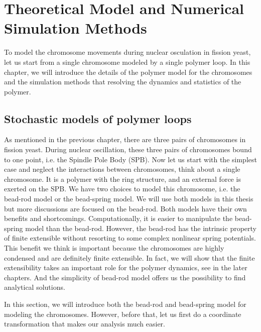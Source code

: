 
\chapter{Theoretical Model and Numerical Simulation Methods}
\graphicspath{{Chapter2/Figs/}}

To model the chromosome movements during nuclear osculation in fission yeast, let us start from a single chromosome modeled by a single polymer loop. 
In this chapter, we will introduce the details of the polymer model for the chromosomes and the simulation methods that resolving the dynamics and statistics of the polymer. 


\section{Stochastic models of polymer loops}
\label{sec:stochastic_models_of_polymer_loops}

As mentioned in the previous chapter, there are three pairs of chromosomes in fission yeast. During nuclear oscillation, these three pairs of chromosomes bound to one point, i.e. the Spindle Pole Body (SPB). Now let us start with the simplest case and neglect the interactions between chromosomes, think about a single chromosome. It is a polymer with the ring structure, and an external force is exerted on the SPB. We have two choices to model this chromosome, i.e. the bead-rod model or the bead-spring model. We will use both models in this thesis but more discussions are focused on the bead-rod. Both models have their own benefits and shortcomings. Computationally, it is easier to manipulate the bead-spring model than the bead-rod. However, the bead-rod has the intrinsic property of finite extensible without resorting to some complex nonlinear spring potentials. This benefit we think is important because the chromosomes are highly condensed and are definitely finite extensible. In fact, we will show that the finite extensibility takes an important role for the polymer dynamics, see in the later chapters. And the simplicity of bead-rod model offers us the possibility to find analytical solutions. 

In this section, we will introduce both the bead-rod and bead-spring model for modeling the chromosomes. However, before that, let us first do a coordinate transformation that makes our analysis much easier. 

